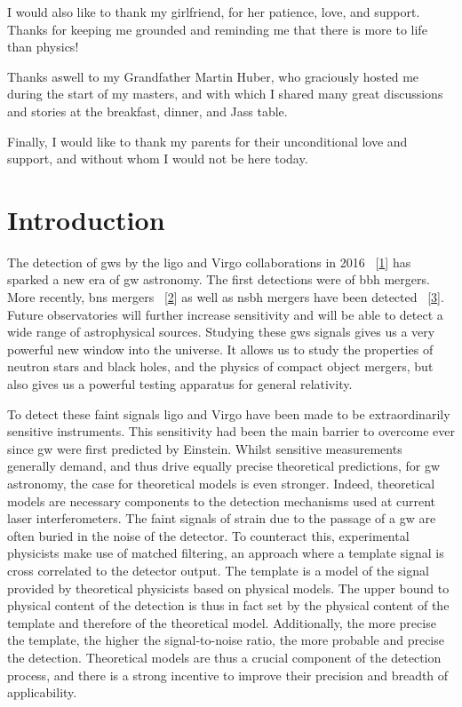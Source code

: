 \documentclass[
  11pt,
  a4paper,
  DIV=11,
  numbers=noendperiod,
  twoside]{scrreprt}
\DeclareRobustCommand{\[}{\begin{equation}}
\DeclareRobustCommand{\]}{\end{equation}}
\begin{document}
I would also like to thank my girlfriend, for her patience, love, and
support. Thanks for keeping me grounded and reminding me that there is
more to life than physics!

Thanks aswell to my Grandfather Martin Huber, who graciously hosted me
during the start of my masters, and with which I shared many great
discussions and stories at the breakfast, dinner, and Jass table.

Finally, I would like to thank my parents for their unconditional love
and support, and without whom I would not be here today.


\hypertarget{sec-intro}{%
\chapter{Introduction}\label{sec-intro}}

The detection of \glspl{gw} by the \gls{ligo} and Virgo collaborations
in 2016 ~{[}\protect\hyperlink{ref-LIGOScientific:2016aoc}{1}{]} has
sparked a new era of \gls{gw} astronomy. The first detections were of
\gls{bbh} mergers. More recently, \gls{bns} mergers
~{[}\protect\hyperlink{ref-LIGOScientific:2017vwq}{2}{]} as well as
\gls{nsbh} mergers have been detected
~{[}\protect\hyperlink{ref-LIGOScientific:2021qlt}{3}{]}. Future
observatories will further increase sensitivity and will be able to
detect a wide range of astrophysical sources. Studying these \glspl{gw}
signals gives us a very powerful new window into the universe. It allows
us to study the properties of neutron stars and black holes, and the
physics of compact object mergers, but also gives us a powerful testing
apparatus for general relativity.

To detect these faint signals \gls{ligo} and Virgo have been made to be
extraordinarily sensitive instruments. This sensitivity had been the
main barrier to overcome ever since \gls{gw} were first predicted by
Einstein. Whilst sensitive measurements generally demand, and thus drive
equally precise theoretical predictions, for \gls{gw} astronomy, the
case for theoretical models is even stronger. Indeed, theoretical models
are necessary components to the detection mechanisms used at current
laser interferometers. The faint signals of strain due to the passage of
a \gls{gw} are often buried in the noise of the detector. To counteract
this, experimental physicists make use of matched filtering, an approach
where a template signal is cross correlated to the detector output. The
template is a model of the signal provided by theoretical physicists
based on physical models. The upper bound to physical content of the
detection is thus in fact set by the physical content of the template
and therefore of the theoretical model. Additionally, the more precise
the template, the higher the signal-to-noise ratio, the more probable
and precise the detection. Theoretical models are thus a crucial
component of the detection process, and there is a strong incentive to
improve their precision and breadth of applicability.
\end{document}
